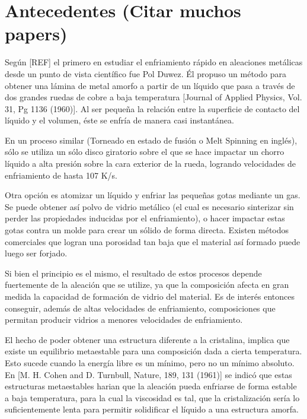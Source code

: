 
\section{Antecedentes (Citar muchos papers)}
\label{S1_2}

Según [REF] el primero en estudiar el enfriamiento rápido en aleaciones metálicas desde un punto de vista científico fue Pol Duwez. Él propuso un método para obtener una lámina de metal amorfo a partir de un líquido que pasa a través de dos grandes ruedas de cobre a baja temperatura [Journal of Applied Physics, Vol. 31, Pg 1136 (1960)]. Al ser pequeña la relación entre la superficie de contacto del líquido y el volumen, éste se enfría de manera casi instantánea.

En un proceso similar (Torneado en estado de fusión o Melt Spinning en inglés), sólo se utiliza un sólo disco giratorio sobre el que se hace impactar un chorro líquido a alta presión sobre la cara exterior de la rueda, logrando velocidades de enfriamiento de hasta 107 K/s.

Otra opción es atomizar un líquido y enfriar las pequeñas gotas mediante un gas. Se puede obtener así polvo de vidrio metálico (el cual es necesario sinterizar sin perder las propiedades inducidas por el enfriamiento), o hacer impactar estas gotas contra un molde para crear un sólido de forma directa. Existen métodos comerciales que logran una porosidad tan baja que el material así formado puede luego ser forjado.

Si bien el principio es el mismo, el resultado de estos procesos depende fuertemente de la aleación que se utilize, ya que la composición afecta en gran medida la capacidad de formación de vidrio del material. Es de interés entonces conseguir, además de altas velocidades de enfriamiento, composiciones que permitan producir vidrios a menores velocidades de enfriamiento.

El hecho de poder obtener una estructura diferente a la cristalina, implica que existe un equilibrio metaestable para una composición dada a cierta temperatura. Esto sucede cuando la energía libre es un mínimo, pero no un mínimo absoluto. En [M. H. Cohen and D. Turnbull, Nature, 189, 131 (1961)] se indicó que estas estructuras metaestables harian que la aleación pueda enfriarse de forma estable a baja temperatura, para la cual la viscosidad es tal, que la cristalización sería lo suficientemente lenta para permitir solidificar el líquido a una estructura amorfa.

